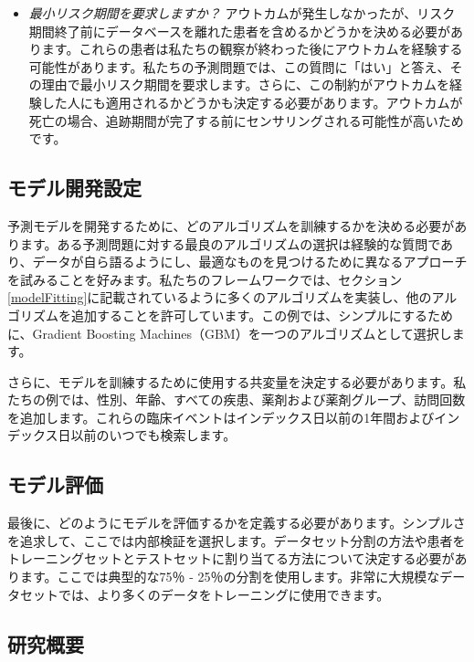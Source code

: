\documentclass[
  11pt]{book}
\theoremstyle{definition}
\theoremstyle{definition}
\theoremstyle{definition}
\theoremstyle{definition}
\theoremstyle{remark}
\begin{document}
\begin{itemize}
\item
  \emph{最小リスク期間を要求しますか？} アウトカムが発生しなかったが、リスク期間終了前にデータベースを離れた患者を含めるかどうかを決める必要があります。これらの患者は私たちの観察が終わった後にアウトカムを経験する可能性があります。私たちの予測問題では、この質問に「はい」と答え、その理由で最小リスク期間を要求します。さらに、この制約がアウトカムを経験した人にも適用されるかどうかも決定する必要があります。アウトカムが死亡の場合、追跡期間が完了する前にセンサリングされる可能性が高いためです。
\end{itemize}

\subsection{モデル開発設定}\label{ux30e2ux30c7ux30ebux958bux767aux8a2dux5b9a}

予測モデルを開発するために、どのアルゴリズムを訓練するかを決める必要があります。ある予測問題に対する最良のアルゴリズムの選択は経験的な質問であり、データが自ら語るようにし、最適なものを見つけるために異なるアプローチを試みることを好みます。私たちのフレームワークでは、セクション \ref{modelFitting}に記載されているように多くのアルゴリズムを実装し、他のアルゴリズムを追加することを許可しています。この例では、シンプルにするために、Gradient Boosting Machines（GBM）を一つのアルゴリズムとして選択します。

さらに、モデルを訓練するために使用する共変量を決定する必要があります。私たちの例では、性別、年齢、すべての疾患、薬剤および薬剤グループ、訪問回数を追加します。これらの臨床イベントはインデックス日以前の1年間およびインデックス日以前のいつでも検索します。

\subsection{モデル評価}\label{ux30e2ux30c7ux30ebux8a55ux4fa1}

最後に、どのようにモデルを評価するかを定義する必要があります。シンプルさを追求して、ここでは内部検証を選択します。データセット分割の方法や患者をトレーニングセットとテストセットに割り当てる方法について決定する必要があります。ここでは典型的な75％ - 25％の分割を使用します。非常に大規模なデータセットでは、より多くのデータをトレーニングに使用できます。

\subsection{研究概要}\label{ux7814ux7a76ux6982ux8981}
\end{document}

